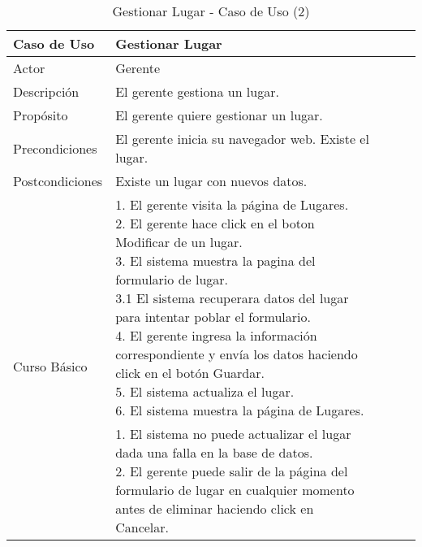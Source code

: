 \begin{table}[H]
    \begin{tabular}{@{} *5l @{}} \toprule
    \textbf{Caso de Uso} & Gestionar Lugar \\ \midrule
    Actor & Gerente \\ 
    Descripción & El gerente gestiona un lugar. \\ 
    Propósito & El gerente quiere gestionar un lugar. \\ \midrule
    Precondiciones & El gerente inicia su navegador web. Existe el lugar. \\ \midrule
    Postcondiciones & Existe un lugar con nuevos datos. \\ \midrule
    \multirow{4}{*}{Curso Básico}
        & \parbox{0.75\linewidth}{ 
                1. El gerente visita la página de Lugares. \\
                2. El gerente hace click en el boton Modificar de un lugar. \\
                3. El sistema muestra la pagina del formulario de lugar. \\
                    3.1 El sistema recuperara datos del lugar para intentar poblar el formulario. \\
                4. El gerente ingresa la información correspondiente y envía los datos haciendo click en el botón Guardar. \\
                5. El sistema actualiza el lugar.  \\
                6. El sistema muestra la página de Lugares.   
        } \\ \midrule
        & \parbox{0.75\linewidth}{ 
            1. El sistema no puede actualizar el lugar dada una falla en la base de datos. \\
            2. El gerente puede salir de la página del formulario de lugar en cualquier momento antes de eliminar haciendo click en Cancelar.
        }  \\  \bottomrule
     \hline
    \end{tabular}
        \caption{Gestionar Lugar - Caso de Uso (2)}
        \label{tab:tabcu-lugar}
\end{table}


